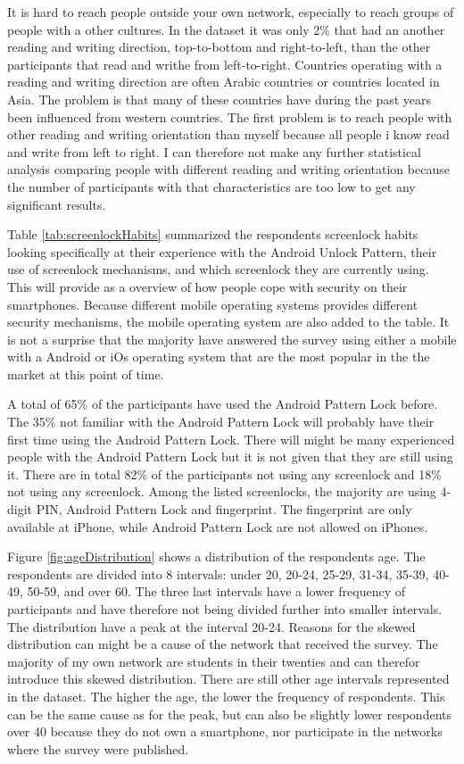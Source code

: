    It is hard to reach people outside your own network, especially to reach groups of people with a other cultures. In the dataset it was only 2\% that had an another reading and writing direction, top-to-bottom and right-to-left, than the other participants that read and writhe from left-to-right. Countries operating with a reading and writing direction are often Arabic countries or countries located in Asia. The problem is that many of these countries have during the past years been influenced from western countries. The first problem is to reach people with other reading and writing orientation than myself because all people i know read and write from left to right. I can therefore not make any further statistical analysis comparing people with different reading and writing orientation because the number of participants with that characteristics are too low to get any significant results.

    Table \ref{tab:screenlockHabits} summarized the respondents screenlock habits looking specifically at their experience with the Android Unlock Pattern, their use of screenlock mechanisms, and which screenlock they are currently using. This will provide as a overview of how people cope with security on their smartphones. Because different mobile operating systems provides different security mechanisms, the mobile operating system are also added to the table. It is not a surprise that the majority have answered the survey using either a mobile with a Android or iOs operating system that are the most popular in the the market at this point of time. 

    A total of 65\% of the participants have used the Android Pattern Lock before. The 35\% not familiar with the Android Pattern Lock will probably have their first time using the Android Pattern Lock. There will might be many experienced people with the Android Pattern Lock but it is not given that they are still using it. There are in total 82\% of the participants not using any screenlock and 18\% not using any screenlock. Among the listed screenlocks, the majority are using 4-digit PIN, Android Pattern Lock and fingerprint. The fingerprint are only available at iPhone, while Android Pattern Lock are not allowed on iPhones.

    \clearpage  

    Figure \ref{fig:ageDistribution} shows a distribution of the respondents age. The respondents are divided into 8 intervals: under 20, 20-24, 25-29, 31-34, 35-39, 40-49, 50-59, and over 60. The three last intervals have a lower frequency of participants and have therefore not being divided further into smaller intervals. The distribution have a peak at the interval 20-24. Reasons for the skewed distribution can might be a cause of the network that received the survey. The majority of my own network are students in their twenties and can therefor introduce this skewed distribution. There are still other age intervals represented in the dataset. The higher the age, the lower the frequency of respondents. This can be the same cause as for the peak, but can also be slightly lower respondents over 40 because they do not own a smartphone, nor participate in the networks where the survey were published.

